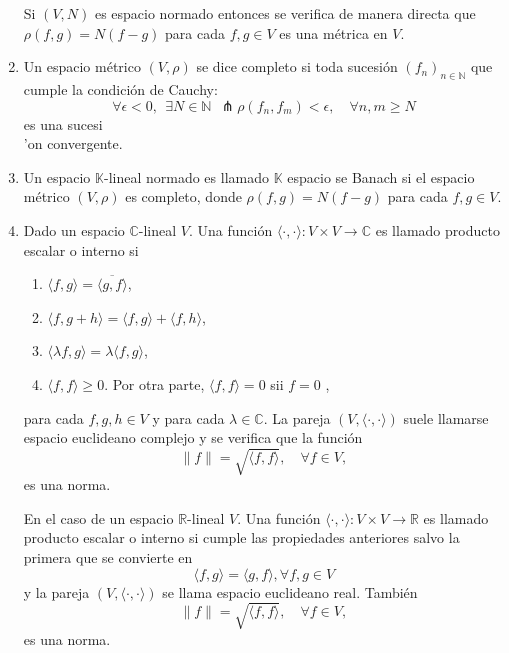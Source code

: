 \documentclass[twoside,12pt,a4 paper,openright]{book}
\begin{document}
\begin{enumerate}
Si $(V,N)$ es  espacio normado  entonces se verifica de manera directa que  
$\rho(f,g) =N(f-g)$ para cada $f,g\in V$ es una m\'etrica en $V$. 














 
\item Un espacio   m\'etrico   $(V,\rho)$ se dice completo si toda sucesi\'on $(f_n)_{n\in \mathbb N}$ que cumple la condici\'on de Cauchy:  
$$\forall \epsilon<0, \ \  \exists N\in\mathbb N \ \ \pitchfork \rho(f_n, f_m) <\epsilon, \quad \forall n,m\geq N$$
es una sucesi\\'on convergente.






 
\item Un espacio $\mathbb K$-lineal normado es  llamado  $\mathbb K$ espacio  se Banach  si 
 el espacio  m\'etrico $(V, \rho) $ es completo, donde  
 $\rho(f,g) =N(f-g)$ para cada $f,g\in V$.
 
 
 \item 	  Dado un espacio $\mathbb C$-lineal $V$. Una funci\'on $\langle \cdot,  \cdot\rangle: V\times V \to \mathbb C$ es llamado producto escalar o interno si 
	\begin{enumerate}
	\item $\langle f,g\rangle =\overline{\langle g,f\rangle }$,
	\item $\langle f,g+h \rangle = {\langle f,g \rangle } + \langle f,h \rangle$,
	\item $\langle \lambda  f,g\rangle =\lambda {\langle f,g\rangle }$,
	\item $\langle  f, f \rangle \geq 0$. Por otra parte,  $\langle  f, f \rangle = 0$ sii  $f=0$ ,
	\end{enumerate}
	para cada $f,g,h\in V$ y para cada $\lambda\in \mathbb C$.
 La pareja $(V, \langle \cdot,  \cdot\rangle)$ suele llamarse espacio euclideano complejo y se verifica que  la funci\'on 
$$\|f\|= \sqrt{\langle  f,f \rangle}, \quad \forall f\in V,$$
es una norma.  

En el caso de  un espacio $\mathbb R$-lineal $V$. Una funci\'on $\langle \cdot,  \cdot\rangle: V\times V \to \mathbb R$ es llamado producto escalar o interno  si cumple las propiedades anteriores salvo la primera que se convierte en 
$$\langle    f,g\rangle = \langle g,f\rangle , \forall f,g\in V  $$
y  la pareja $(V, \langle \cdot,  \cdot\rangle)$ se llama espacio euclideano real.
 Tambi\'en $$\|f\|= \sqrt{\langle  f,f \rangle}, \quad \forall f\in V,$$
es una norma.  




\end{enumerate}
\end{document}

